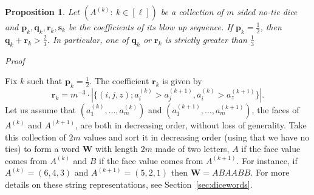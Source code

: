 \documentclass[reqno,a4paper,11pt]{amsart}
\makeatletter
\newtheorem{proposition}[lemma]{Proposition}
\theoremstyle{remark}
\newcommand{\mb}[1]{{\mathbf #1}}
\numberwithin{equation}{section}
\renewenvironment{proof}[1][Proof]{\par
\pushQED{\qed}%
\normalfont \topsep6\p@\@plus6\p@\relax
\trivlist
\item\relax
{\itshape
#1\@addpunct{.}}\hspace\labelsep\ignorespaces
}{%
\popQED\endtrivlist\@endpefalse
}
\makeatother
\begin{document}
\begin{proposition}
\label{prop:blowup_impossible_nointransitive}
    Let $(A^{(k)}:\ k \in [\ell])$ be a collection of $m$ sided no-tie dice and
    $\mb p_k, \mb q_k, \mb r_k, \mb s_k$ be the coefficients of its blow up
    sequence. If $\mb p_k = \frac{1}{2}$, then
    $\mb q_k+\mb r_k > \frac{2}{3}$. In particular, one of $\mb q_k$ or $\mb r_k$ is strictly greater than $\frac{1}{3}$
\end{proposition}

\begin{proof}
    Fix $k$ such that $\mb p_k = \frac{1}{2}$.
    The coefficient $\mb r_k$ is given by 
    \begin{equation*}
    \mb r_k
        = m^{-3} \cdot
            |\{(i,j,z); a_i^{(k)} > a_j^{(k+1)}, a_i^{(k)} > a_z^{(k+1)}\}|.
    \end{equation*}
    Let us assume that $(a_1^{(k)}, \ldots, a_m^{(k)})$ and 
    $(a_1^{(k+1)}, \ldots, a_m^{(k+1)})$, the faces of $A^{(k)}$ and
    $A^{(k+1)}$, are both in decreasing order, without loss of generality.
    Take this collection of $2m$ values and sort it in decreasing order
    (using that we have no ties) to form a word $\mb W$ with length $2m$
    made of two letters, $A$ if the face value comes from $A^{(k)}$ and
    $B$ if the face value comes from $A^{(k+1)}$.
    For instance, if $A^{(k)} = (6,4,3)$ and $A^{(k+1)} = (5,2,1)$ then
    $\mb W = ABAABB$. For more details on these string representations, see
    Section~\ref{sec:dicewords}.
    

\end{proof}
\end{document}
